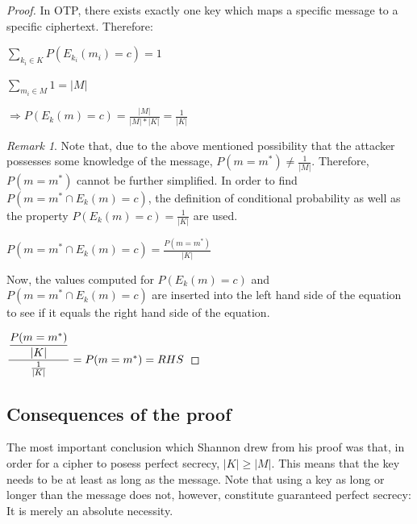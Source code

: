 \documentclass[12pt]{report}
\theoremstyle{definition}
\theoremstyle{remark}
\newtheorem{rem}[thm]{Remark}
\begin{document}
\begin{proof}
In OTP, there exists exactly one key which maps a specific message to a specific ciphertext. Therefore:

$\sum\limits_{k_i \in K}
P(E_{k_i}(m_i)=c)
=1$

$\sum\limits_{m_i \in M} 1
= \lvert M \rvert$

$\Rightarrow P({E_k}(m)=c) = \frac{\lvert M \rvert}{\lvert M \rvert*\lvert K \rvert} = \frac{1}{\lvert K \rvert}$

\begin{rem}
Note that, due to the above mentioned possibility that the attacker possesses some knowledge of the message, $P(m=m^{*}) \neq \frac{1}{\lvert M \rvert}$. Therefore, $P(m=m^{*})$ cannot be further simplified. In order to find $P(m=m^{*} \cap {E_k}(m)=c)$, the definition of conditional probability as well as the property $P({E_k}(m)=c) = \frac{1}{\lvert K \rvert}$ are used.
\end{rem}

$P(m=m^{*} \cap {E_k}(m)=c) = \frac{P(m=m^{*})}{\lvert K \rvert}$

Now, the values computed for $P({E_k}(m)=c)$ and $P(m=m^{*} \cap {E_k}(m)=c)$ are inserted into the left hand side of the equation to see if it equals the right hand side of the equation.

$\dfrac{\dfrac{P(m=m^{*})}{\lvert K \rvert}}{\frac{1}{\lvert K \rvert}} = P(m=m^{*}) \\
= RHS$
\end{proof}

\subsection{Consequences of the proof}


The most important conclusion which Shannon drew from his proof was that, in order for a cipher to posess perfect secrecy, $\lvert K \rvert \geqslant \lvert M \rvert$\cite{ShannonOTP}. This means that the key needs to be at least as long as the message. Note that using a key as long or longer than the message does not, however, constitute guaranteed perfect secrecy: It is merely an absolute necessity.
\end{document}
